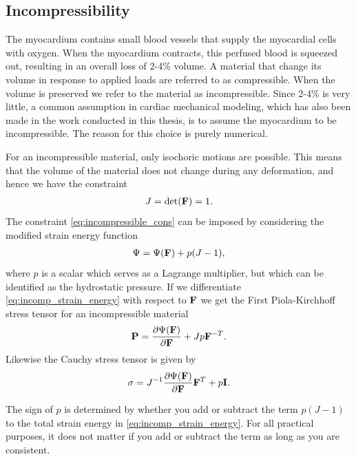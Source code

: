 \subsection{Incompressibility}
\label{sec:incompressibility}

The myocardium contains small blood vessels that supply the
myocardial cells with oxygen. When the myocardium contracts, this
perfused blood is squeezed out, resulting in an overall loss of
2-4\% volume\cite{yin1996compressibility}. A material that change its
volume in response to applied loads are referred to as compressible. When the 
volume is preserved we refer to the material as incompressible.
Since 2-4\% is very little, a common assumption in cardiac mechanical modeling,
which has also been made in the work conducted in this thesis, is to assume
the myocardium to be incompressible. The reason for this choice is
purely numerical.

For an incompressible material, only isochoric motions are
possible. This means that the volume of the material does not change during
any deformation, and hence we have the constraint 
\begin{align}
  J = \det(\mathbf{F}) = 1.
  \label{eq:incompressible_cons}
\end{align}
The constraint \eqref{eq:incompressible_cons} can be imposed by
considering the modified strain energy function
\begin{align}
  \Psi = \Psi(\mathbf{F}) + p(J-1),
  \label{eq:incomp_strain_energy}
\end{align}
where $p$ is a scalar which serves as a Lagrange multiplier, but which
can be identified as the hydrostatic pressure. If we differentiate
\eqref{eq:incomp_strain_energy} with respect to $\mathbf{F}$ we get the First
Piola-Kirchhoff stress tensor for an incompressible material
\begin{align}
  \mathbf{P} = \frac{\partial \Psi(\mathbf{F})}{\partial \mathbf{F}} + J p \mathbf{F}^{-T}.
\end{align}
Likewise the Cauchy stress tensor is given by
\begin{align}
  \mathbf{\sigma} = J^{-1} \frac{\partial \Psi(\mathbf{F})}{\partial \mathbf{F}}\mathbf{F}^{T} + p \mathbf{I}.
  \label{eq:cauchy_incomp}
\end{align}


\begin{remark}
  The sign of $p$ is determined by whether you add or subtract the term
  $ p(J-1)$ to the total strain energy in
  \eqref{eq:incomp_strain_energy}. For all practical purposes, it
  does not matter if you add or subtract the term as long as you are
  consistent. 
\end{remark}


